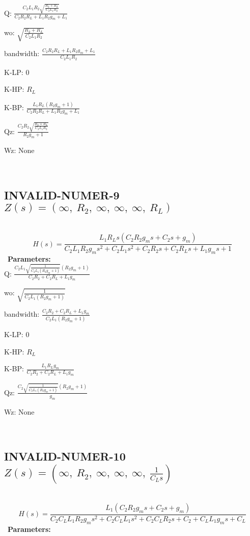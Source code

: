 \documentclass{article}
\begin{document}
Q: $\frac{C_{2} L_{1} R_{2} \sqrt{\frac{R_{2} + R_{L}}{C_{2} L_{1} R_{2}}}}{C_{2} R_{2} R_{L} + L_{1} R_{2} g_{m} + L_{1}}$\ 

wo: $\sqrt{\frac{R_{2} + R_{L}}{C_{2} L_{1} R_{2}}}$\ 

bandwidth: $\frac{C_{2} R_{2} R_{L} + L_{1} R_{2} g_{m} + L_{1}}{C_{2} L_{1} R_{2}}$\ 

K-LP: $0$\ 

K-HP: $R_{L}$\ 

K-BP: $\frac{L_{1} R_{L} \left(R_{2} g_{m} + 1\right)}{C_{2} R_{2} R_{L} + L_{1} R_{2} g_{m} + L_{1}}$\ 

Qz: $\frac{C_{2} R_{2} \sqrt{\frac{R_{2} + R_{L}}{C_{2} L_{1} R_{2}}}}{R_{2} g_{m} + 1}$\ 

Wz: $\text{None}$\ 

\ 

\subsection{INVALID-NUMER-9 $Z(s) = \left( \infty, \  R_{2}, \  \infty, \  \infty, \  \infty, \  R_{L}\right)$ } \ 
\textbf{\[H(s) = \frac{L_{1} R_{L} s \left(C_{2} R_{2} g_{m} s + C_{2} s + g_{m}\right)}{C_{2} L_{1} R_{2} g_{m} s^{2} + C_{2} L_{1} s^{2} + C_{2} R_{2} s + C_{2} R_{L} s + L_{1} g_{m} s + 1}\] } \ 
\textbf{Parameters:}\\ 

Q: $\frac{C_{2} L_{1} \sqrt{\frac{1}{C_{2} L_{1} \left(R_{2} g_{m} + 1\right)}} \left(R_{2} g_{m} + 1\right)}{C_{2} R_{2} + C_{2} R_{L} + L_{1} g_{m}}$\ 

wo: $\sqrt{\frac{1}{C_{2} L_{1} \left(R_{2} g_{m} + 1\right)}}$\ 

bandwidth: $\frac{C_{2} R_{2} + C_{2} R_{L} + L_{1} g_{m}}{C_{2} L_{1} \left(R_{2} g_{m} + 1\right)}$\ 

K-LP: $0$\ 

K-HP: $R_{L}$\ 

K-BP: $\frac{L_{1} R_{L} g_{m}}{C_{2} R_{2} + C_{2} R_{L} + L_{1} g_{m}}$\ 

Qz: $\frac{C_{2} \sqrt{\frac{1}{C_{2} L_{1} \left(R_{2} g_{m} + 1\right)}} \left(R_{2} g_{m} + 1\right)}{g_{m}}$\ 

Wz: $\text{None}$\ 

\ 

\subsection{INVALID-NUMER-10 $Z(s) = \left( \infty, \  R_{2}, \  \infty, \  \infty, \  \infty, \  \frac{1}{C_{L} s}\right)$ } \ 
\textbf{\[H(s) = \frac{L_{1} \left(C_{2} R_{2} g_{m} s + C_{2} s + g_{m}\right)}{C_{2} C_{L} L_{1} R_{2} g_{m} s^{2} + C_{2} C_{L} L_{1} s^{2} + C_{2} C_{L} R_{2} s + C_{2} + C_{L} L_{1} g_{m} s + C_{L}}\] } \ 
\textbf{Parameters:}\\ 
\end{document}
